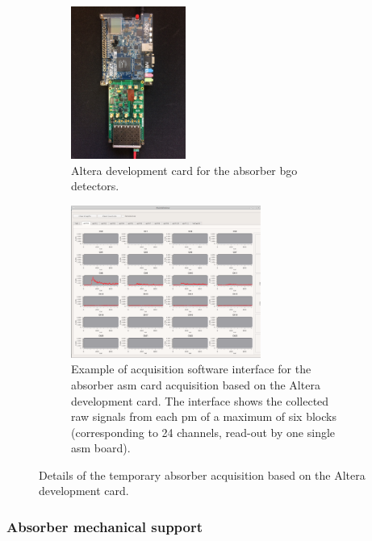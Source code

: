 \begin{figure}
\begin{subfigure}[t]{0.5\textwidth}
\centering
\includegraphics[width=0.75\linewidth, angle = 90, height=5cm]{03_GraphicFiles/chapter3_CLaRySproto/Absorber/develCard_zoom.jpg}
\caption{Altera development card for the absorber \gls{bgo} detectors.}
\label{chap3::fig::absDevelcard} 
\end{subfigure}
\begin{subfigure}[t]{0.5\textwidth}
\centering
\includegraphics[width=\linewidth, height=5cm]{03_GraphicFiles/chapter3_CLaRySproto/Absorber/daq_develCard.png}
\caption{Example of acquisition software interface for the absorber \gls{asm} card acquisition based on the Altera development card. The interface shows the collected raw signals from each \gls{pm} of a maximum of six blocks (corresponding to 24 channels, read-out by one single \gls{asm} board).}
\label{chap3::fig::softDevelCard}  
\end{subfigure}
\caption{Details of the temporary absorber acquisition based on the Altera development card.}
\label{chap5::fig::AbsorberDevelCards}
\end{figure}

\subsubsection{Absorber mechanical support}\label{chap3::subsubsec::AbsorberMechanics}

